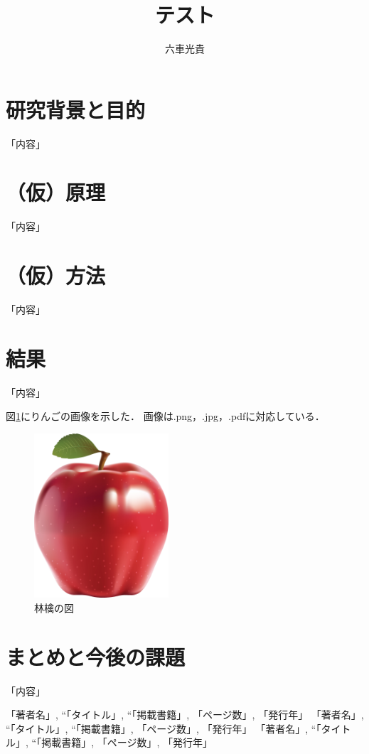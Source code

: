 \documentclass[11pt,dvipdfmx]{abst5lab}
\title{テスト}
\author{六車光貴}
\affil{京都大学生存圏研究所 橋口研究室}
\begin{document}
\maketitle

\thispagestyle{empty}

\section{研究背景と目的}


「内容」

\section{（仮）原理}

「内容」


\section{（仮）方法}
「内容」


\section{結果}
「内容」

図\ref{im:apple}にりんごの画像を示した．
画像は.png，.jpg，.pdfに対応している．

\begin{figure}[H]
  \centering
  \includegraphics[width=5cm]{fig/apple.jpg}
  \caption{林檎の図}
  \label{im:apple}
\end{figure}

\section{まとめと今後の課題}


「内容」

\begin{thebibliography}{9}
 
    「著者名」, ``「タイトル」, ``「掲載書籍」, 「ページ数」, 「発行年」 
   「著者名」, ``「タイトル」, ``「掲載書籍」, 「ページ数」, 「発行年」 
   「著者名」, ``「タイトル」, ``「掲載書籍」, 「ページ数」, 「発行年」 


\end{thebibliography}
\end{document}
